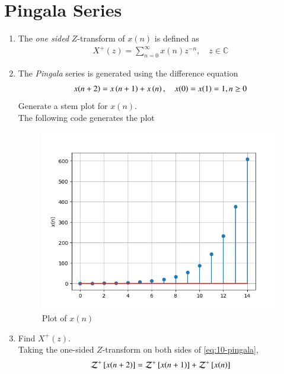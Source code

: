 \documentclass[journal,12pt,twocolumn]{IEEEtran}
\renewcommand\thesection{\arabic{section}}
\begin{document}
\section{Pingala Series}
\begin{enumerate}[label=\thesection.\arabic*,ref=\thesection.\theenumi]
\item The {\em one sided} $Z$-transform of $x(n)$ is defined as 
\begin{align}
	X^{+}(z) = \sum_{n = 0}^{\infty}x(n)z^{-n}, \quad z \in \mathbb{C}
\label{eq:one-Z}
\end{align}
	\item The {\em Pingala} series is generated using the difference equation 
\begin{align}
	x(n+2) = x\left(n+1\right) + x\left(n\right),  \quad x(0) = x(1) = 1, n \ge 0
	\label{eq:10-pingala}
\end{align}
Generate a stem plot for $x(n)$.
\\
\solution
The following code generates the plot

\begin{figure}[!htp]
    \includegraphics[width=\columnwidth]{figures/Figure_2_2.png}
    \caption{Plot of $x(n)$}
    \label{fig:xn}
\end{figure}
\newpage
\item Find $X^{+}(z)$.
\\
\solution Taking the one-sided $Z$-transform on both sides of \eqref{eq:10-pingala},
\begin{align}
    &\mathcal{Z}^+\sbrak{x(n + 2)} = \mathcal{Z}^+\sbrak{x(n + 1)} + \mathcal{Z}^+\sbrak{x(n)} \\

\end{align}
\end{enumerate}
\end{document}
